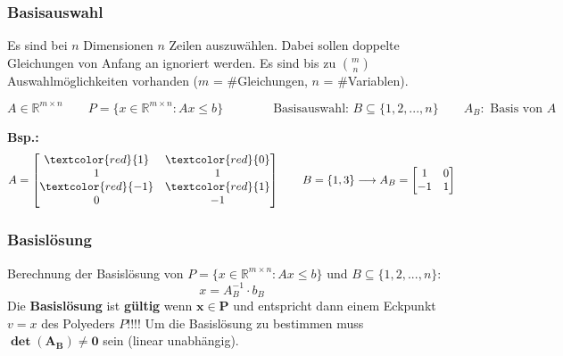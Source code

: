   \subsubsection{Basisauswahl}
    Es sind bei $n$ Dimensionen $n$ Zeilen auszuwählen. Dabei sollen doppelte Gleichungen von Anfang an ignoriert werden.
    Es sind bis zu $\binom{m}{n}$ Auswahlmöglichkeiten vorhanden ($m$ = \#Gleichungen, $n$ = \#Variablen).
    
    \[ A \in \mathbb{R}^{m\times n} \qquad P = \{ x \in \mathbb{R}^{m\times n} : A x \leq b \} \qquad \qquad \text{Basisauswahl: }B\subseteq \{1,2,...,n\} \qquad  A_B : \text{ Basis von }A \]
    
    \textbf{Bsp.:}
    \[  A=
    	\begin{bmatrix}
    		\textcolor{red}{1} & \textcolor{red}{0} \\
    		1 & 1 \\
    		\textcolor{red}{-1} & \textcolor{red}{1} \\
    		0 & -1
    	\end{bmatrix}
    	\qquad
    	B=\{1,3\} \longrightarrow A_B = 
    	\begin{bmatrix}
 	    		1 & 0 \\
 	    		-1 & 1
    	 \end{bmatrix}
    \]
    
    
  \subsubsection{Basislösung}
  	Berechnung der Basislösung von $P = \{ x \in \mathbb{R}^{m\times n} : A x \leq b \}$ und $B\subseteq \{1,2,...,n\}$:
  	\[ x = A_B^{-1} \cdot b_B \]
  	Die \textbf{Basislösung} ist \textbf{gültig} wenn $\mathbf{x \in P}$ und entspricht dann einem Eckpunkt $v=x$ des Polyeders $P$!!!!
    Um die Basislösung zu bestimmen muss $\mathbf{\det(A_B)\neq 0}$ sein (linear unabhängig).
    
    
